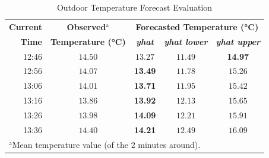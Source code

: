 \documentclass[conference]{IEEEtran}
\begin{document}
\begin{table}[htbp]
    \caption{Outdoor Temperature Forecast Evaluation}
    \begin{center}
        \begin{tabular}{|r|c|c|c|c|}
            \hline
            \textbf{Current} & \textbf{Observed}$^{\mathrm{a}}$ & \multicolumn{3}{|c|}{\textbf{Forecasted Temperature (°C)}} \\
            \cline{3-5}
            \textbf{Time} & \textbf{Temperature (°C)} & \textbf{\textit{yhat}} & \textbf{\textit{yhat lower}} & \textbf{\textit{yhat upper}} \\
            \hline
            12:46 & $14.50$ & $13.27$ & $11.49$ & \textbf{14.97} \\
            \hline
            12:56 & $14.07$ & \textbf{13.49} & $11.78$ & $15.26$ \\
            \hline
            13:06 & $14.01$ & \textbf{13.71} & $11.95$ & $15.42$ \\
            \hline
            13:16 & $13.86$ & \textbf{13.92} & $12.13$ & $15.65$ \\
            \hline
            13:26 & $13.98$ & \textbf{14.09} & $12.21$ & $15.91$ \\
            \hline
            13:36 & $14.40$ & \textbf{14.21} & $12.49$ & $16.09$ \\
            \hline
            \multicolumn{4}{l}{$^{\mathrm{a}}$Mean temperature value (of the 2 minutes around).}
        \end{tabular}
        \label{tab_forecast_outdoor}
    \end{center}
\end{table}
\end{document}

